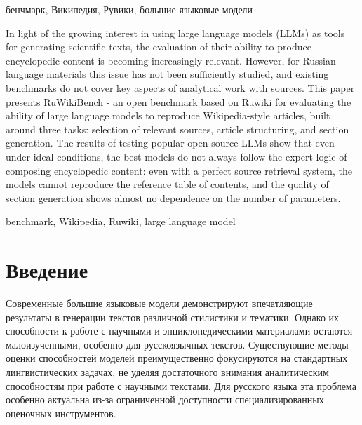 \documentclass{article}
\begin{document}
\begin{keywords}
бенчмарк, Википедия, Рувики, большие языковые модели
\end{keywords}

\begin{altabstract}
In light of the growing interest in using large language models (LLMs) as tools for generating scientific texts,
the evaluation of their ability to produce encyclopedic content is becoming increasingly relevant.
However, for Russian-language materials this issue has not been sufficiently studied, and existing benchmarks do not cover key aspects of analytical work with sources.
This paper presents RuWikiBench - an open benchmark based on Ruwiki for evaluating the ability of large language models to reproduce Wikipedia-style articles,
built around three tasks:
selection of relevant sources, article structuring, and section generation.
The results of testing popular open-source LLMs show that even under ideal conditions, the best models do not always follow the expert logic of composing encyclopedic content:
even with a perfect source retrieval system, the models cannot reproduce the reference table of contents, and the quality of section generation shows almost no dependence on the number of parameters.
\end{altabstract}

\begin{altkeywords}
benchmark, Wikipedia, Ruwiki, large language model
\end{altkeywords}

\section*{Введение}

Современные большие языковые модели демонстрируют впечатляющие результаты в генерации текстов различной стилистики и тематики. 
Однако их способности к работе с научными и энциклопедическими материалами остаются малоизученными, особенно для русскоязычных текстов.
Существующие методы оценки способностей моделей преимущественно фокусируются на стандартных лингвистических задачах, не уделяя достаточного внимания аналитическим способностям при работе с научными текстами.
Для русского языка эта проблема особенно актуальна из-за ограниченной доступности специализированных оценочных инструментов.
\end{document}
